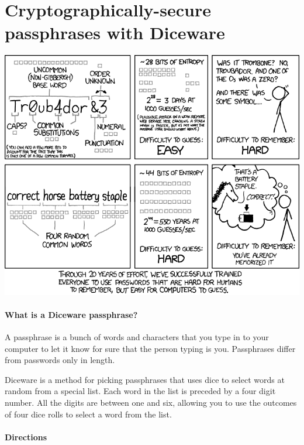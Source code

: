 \chapter*{Cryptographically-secure passphrases with Diceware}

\includegraphics[width=\textwidth]{password_strength.png}

\newpage
\small
\setlength{\parindent}{0em}
\setlength{\parskip}{0.5em}

\subsubsection*{What is a Diceware passphrase?}

A passphrase is a bunch of words and characters that you type in to your computer to let it know for sure that the person typing is you. Passphrases differ from passwords only in length.

Diceware is a method for picking passphrases that uses dice to select words at random from a special list. Each word in the list is preceded by a four digit number. All the digits are between one and six, allowing you to use the outcomes of four dice rolls to select a word from the list.

\subsubsection*{Directions}

